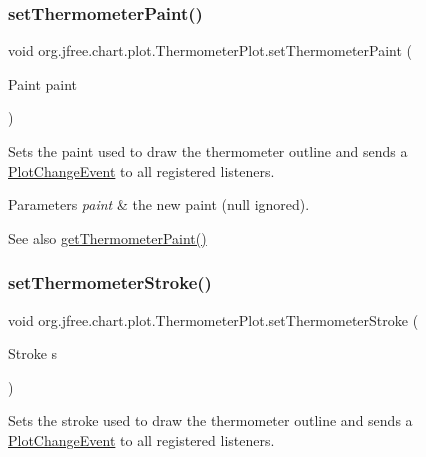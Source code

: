 \subsubsection{\texorpdfstring{set\+Thermometer\+Paint()}{setThermometerPaint()}}
{\footnotesize\ttfamily void org.\+jfree.\+chart.\+plot.\+Thermometer\+Plot.\+set\+Thermometer\+Paint (\begin{DoxyParamCaption}\item[{Paint}]{paint }\end{DoxyParamCaption})}

Sets the paint used to draw the thermometer outline and sends a \mbox{\hyperlink{}{Plot\+Change\+Event}} to all registered listeners.


\begin{DoxyParams}{Parameters}
{\em paint} & the new paint ({\ttfamily null} ignored).\\
\hline
\end{DoxyParams}
\begin{DoxySeeAlso}{See also}
\mbox{\hyperlink{classorg_1_1jfree_1_1chart_1_1plot_1_1_thermometer_plot_ac725954b0973477c957c51b0e359fcda}{get\+Thermometer\+Paint()}} 
\end{DoxySeeAlso}
\mbox{\label{classorg_1_1jfree_1_1chart_1_1plot_1_1_thermometer_plot_aaa2d0470bf85ee2eee9ea9e7568d919b}} 
\subsubsection{\texorpdfstring{set\+Thermometer\+Stroke()}{setThermometerStroke()}}
{\footnotesize\ttfamily void org.\+jfree.\+chart.\+plot.\+Thermometer\+Plot.\+set\+Thermometer\+Stroke (\begin{DoxyParamCaption}\item[{Stroke}]{s }\end{DoxyParamCaption})}

Sets the stroke used to draw the thermometer outline and sends a \mbox{\hyperlink{}{Plot\+Change\+Event}} to all registered listeners.


